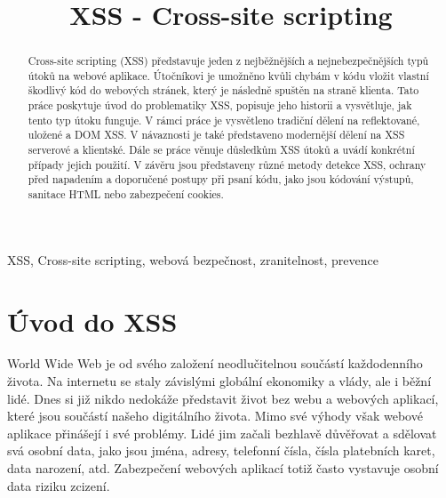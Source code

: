 \documentclass[11pt, conference, a4paper]{IEEEtran}
\begin{document}
\title{XSS \-- Cross\--site scripting}

\author{
}
\maketitle

\begin{abstract}
Cross-site scripting (XSS) představuje jeden z nejběžnějších a nejnebezpečnějších typů útoků na webové aplikace. Útočníkovi je umožněno kvůli chybám v kódu vložit vlastní škodlivý kód do webových stránek, který je následně spuštěn na straně klienta. Tato práce poskytuje úvod do problematiky XSS, popisuje jeho historii a vysvětluje, jak tento typ útoku funguje. V rámci práce je vysvětleno tradiční dělení na reflektované, uložené a DOM XSS. V návaznosti je také představeno modernější dělení na XSS serverové a klientské. Dále se práce věnuje důsledkům XSS útoků a uvádí konkrétní případy jejich použití. V závěru jsou představeny různé metody detekce XSS, ochrany před napadením a doporučené postupy při psaní kódu, jako jsou kódování výstupů, sanitace HTML nebo zabezpečení cookies.
\end{abstract}

\begin{IEEEkeywords}
XSS, Cross-site scripting, webová bezpečnost, zranitelnost, prevence
\end{IEEEkeywords}

\section{Úvod do XSS}

World Wide Web je od svého založení neodlučitelnou součástí každodenního života. Na internetu se staly závislými globální ekonomiky a vlády, ale i běžní lidé. Dnes si již nikdo nedokáže představit život bez webu a webových aplikací, které jsou součástí našeho digitálního života. Mimo své výhody však webové aplikace přinášejí i své problémy. Lidé jim začali bezhlavě důvěřovat a sdělovat svá osobní data, jako jsou jména, adresy, telefonní čísla, čísla platebních karet, data narození, atd. Zabezpečení webových aplikací totiž často vystavuje osobní data riziku zcizení. 
\end{document}

